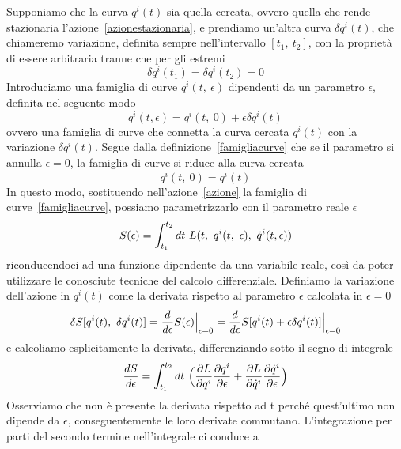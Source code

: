     Supponiamo che la curva $q^i(t)$ sia quella cercata, ovvero quella che rende stazionaria l'azione~\eqref{azionestazionaria}, e prendiamo un'altra curva $\delta q^i(t)$, che chiameremo variazione, definita sempre nell'intervallo $[t_1, ~t_2]$, con la proprietà di essere arbitraria tranne che per gli estremi
    \begin{equation} \label{estreminulli}
        \delta q^i(t_1) = \delta q^i(t_2) = 0
    \end{equation}
    Introduciamo una famiglia di curve $q^i(t, ~\epsilon)$ dipendenti da un parametro $\epsilon$, definita nel seguente modo 
    \begin{equation} \label{famigliacurve}
        q^i(t, \epsilon) = q^i(t, ~0) + \epsilon \delta q^i(t)
    \end{equation}
    ovvero una famiglia di curve che connetta la curva cercata $q^i(t)$ con la variazione $\delta q^i(t)$. Segue dalla definizione~\eqref{famigliacurve} che se il parametro si annulla $\epsilon=0$, la famiglia di curve si riduce alla curva cercata
    \begin{equation*}
        q^i(t, ~ 0) = q^i(t)
    \end{equation*}
    In questo modo, sostituendo nell'azione~\eqref{azione} la famiglia di curve~\eqref{famigliacurve}, possiamo parametrizzarlo con il parametro reale $\epsilon$
    \begin{equation*}
        S(\epsilon) = \int_{t_1}^{t_2}dt~ L(t, ~q^i(t, ~\epsilon), ~\dot q^i(t, \epsilon))
    \end{equation*}
    riconducendoci ad una funzione dipendente da una variabile reale, così da poter utilizzare le conosciute tecniche del calcolo differenziale. Definiamo la variazione dell'azione in $q^i(t)$ come la derivata rispetto al parametro $\epsilon$ calcolata in $\epsilon = 0$
    \begin{equation} \label{variazioneazione}
        \delta S[q^i(t), ~ \delta q^i(t)] = \frac{d}{d\epsilon} S(\epsilon) \Big \vert_{\epsilon = 0} = \frac{d}{d\epsilon} S[q^i(t) + \epsilon \delta q^i(t)] \Big \vert_{\epsilon = 0}
    \end{equation}
    e calcoliamo esplicitamente la derivata, differenziando sotto il segno di integrale
    \begin{equation*}
        \frac{dS}{d\epsilon} = \int_{t_1}^{t_2}dt~ \Big (\frac{\partial L}{\partial q^i} \frac{\partial q^i}{\partial\epsilon} + \frac{\partial L}{\partial\dot q^i} \frac{\partial\dot q^i}{\partial\epsilon} \Big)
    \end{equation*}\label{prova1}
    Osserviamo che non è presente la derivata rispetto ad t perché quest'ultimo non dipende da $\epsilon$, conseguentemente le loro derivate commutano. L'integrazione per parti del secondo termine nell'integrale ci conduce a
